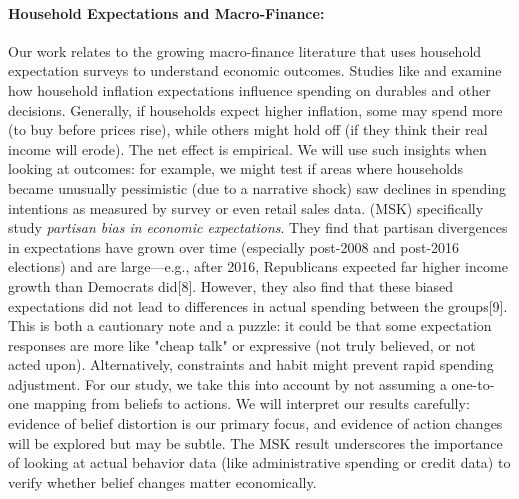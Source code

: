 \documentclass[12pt]{article}
\begin{document}
\paragraph{Household Expectations and Macro-Finance:} Our work relates to the growing macro-finance literature that uses household expectation surveys to understand economic outcomes. Studies like \citet{Bachmann2015} and \citet{D'Acunto2021} examine how household inflation expectations influence spending on durables and other decisions. Generally, if households expect higher inflation, some may spend more (to buy before prices rise), while others might hold off (if they think their real income will erode). The net effect is empirical. We will use such insights when looking at outcomes: for example, we might test if areas where households became unusually pessimistic (due to a narrative shock) saw declines in spending intentions as measured by survey or even retail sales data.
\citet{MianSufiKhoshkhou2022} (MSK) specifically study \emph{partisan bias in economic expectations}. They find that partisan divergences in expectations have grown over time (especially post-2008 and post-2016 elections) and are large—e.g., after 2016, Republicans expected far higher income growth than Democrats did[8]. However, they also find that these biased expectations did not lead to differences in actual spending between the groups[9]. This is both a cautionary note and a puzzle: it could be that some expectation responses are more like "cheap talk" or expressive (not truly believed, or not acted upon). Alternatively, constraints and habit might prevent rapid spending adjustment. For our study, we take this into account by not assuming a one-to-one mapping from beliefs to actions. We will interpret our results carefully: evidence of belief distortion is our primary focus, and evidence of action changes will be explored but may be subtle. The MSK result underscores the importance of looking at actual behavior data (like administrative spending or credit data) to verify whether belief changes matter economically.
\end{document}
